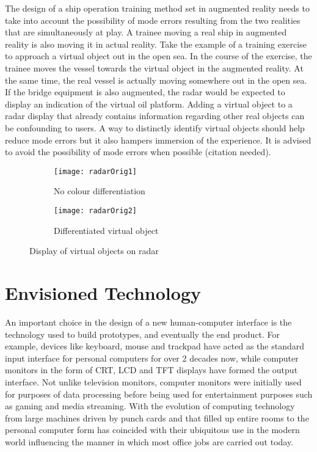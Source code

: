 The design of a ship operation training method set in augmented reality needs to take into account the possibility of mode errors resulting from the two realities that are simultaneously at play. A trainee moving a real ship in augmented reality is also moving it in actual reality. Take the example of a training exercise to approach a virtual object out in the open sea. In the course of the exercise, the trainee moves the vessel towards the virtual object in the augmented reality. At the same time, the real vessel is actually moving somewhere out in the open sea. If the bridge equipment is also augmented, the radar would be expected to display an indication of the virtual oil platform. Adding a virtual object to a radar display that already contains information regarding other real objects can be confounding to users. A way to distinctly identify virtual objects should help reduce mode errors but it also hampers immersion of the experience. 
It is advised to avoid the possibility of mode errors when possible (citation needed). 

\begin{figure}[ht]
    \centering
    \begin{subfigure}[b]{0.45\textwidth}
        \centering
        \texttt{[image: radarOrig1]}
        \caption{No colour differentiation}
        \label{fig:three sin x}
    \end{subfigure}
    \hfill
    \begin{subfigure}[b]{0.45\textwidth}
        \centering
        \texttt{[image: radarOrig2]}
        \caption{Differentiated virtual object}
        \label{fig:five over x}
    \end{subfigure}
    \caption{Display of virtual objects on radar}
    \label{fig:three graphs}
\end{figure}

\section{Envisioned Technology}
\label{sec:envisionedtech}
An important choice in the design of a new human-computer interface is the technology used to build prototypes, and eventually the end product. For example, devices like keyboard, mouse and trackpad have acted as the standard input interface for personal computers for over 2 decades now, while computer monitors in the form of CRT, LCD and TFT displays have formed the output interface. Not unlike television monitors, computer monitors were initially used for purposes of data processing before being used for entertainment purposes such as gaming and media streaming. With the evolution of computing technology from large machines driven by punch cards and that filled up entire rooms to the personal computer form has coincided with their ubiquitous use in the modern world influencing the manner in which most office jobs are carried out today. 

